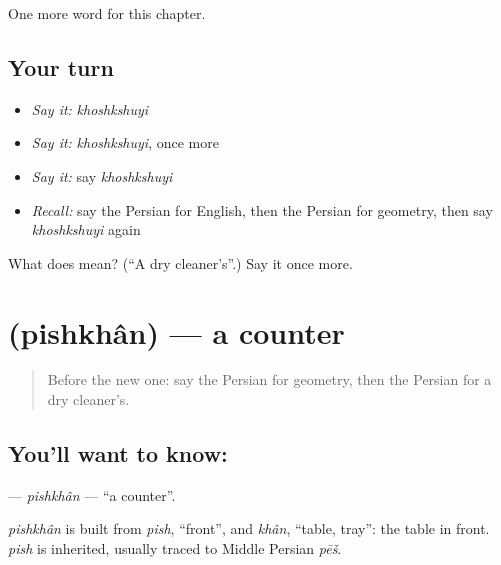 \begin{grammarlens}[title={What you've built}]
One more word for this chapter.
\end{grammarlens}

\subsection*{Your turn}
\begin{itemize}
\raggedright
  \item \emph{Say it:} \emph{khoshkshuyi}
  \item \emph{Say it:} \emph{khoshkshuyi}, once more
  \item \emph{Say it:} say \emph{khoshkshuyi}
  \item \emph{Recall:} say the Persian for English, then the Persian for geometry, then say \emph{khoshkshuyi} again
\end{itemize}

\begin{tcolorbox}[breakable,colback=teal!4,colframe=teal!35!black,title={Before you move on}]
What does  mean? (\textquotedblleft{}A dry cleaner's\textquotedblright{}.) Say it once more.
\end{tcolorbox}
\section[\texorpdfstring{\fa{پیشخوان} (pishkhân)}{پیشخوان (pishkhân)}]{ (pishkhân) — a counter}

\label{lesson:FA-C286-pishkhan}



\begin{quote}
Before the new one: say the Persian for geometry, then the Persian for a dry cleaner's.
\end{quote}

\subsection*{You'll want to know: }
\textbf{} — \emph{pishkhân} — \textquotedblleft{}a counter\textquotedblright{}.

\begin{cousinweb}
\emph{pishkhân} is built from \emph{pish}, \textquotedblleft{}front\textquotedblright{}, and \emph{khân}, \textquotedblleft{}table, tray\textquotedblright{}: the table in front. \emph{pish} is inherited, usually traced to Middle Persian \emph{pēš}.
\end{cousinweb}

